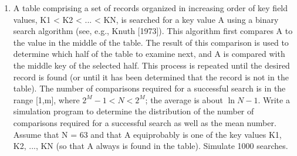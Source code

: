 \begin{enumerate}
  \item A table comprising a set of records organized in increasing order of
    key field values, K1 < K2 < ... < KN, is searched for a key value A using a
    binary search algorithm (see, e.g., Knuth [1973]). This algorithm first
    compares A to the value in the middle of the table. The result of this
    comparison is used to determine which half of the table to examine next,
    and A is compared with the middle key of the selected half. This process is
    repeated until the desired record is found (or until it has been determined
    that the record is not in the table). The number of comparisons required
    for a successful search is in the range [1,m], where \ensuremath{2^{M}-1 < N < 2^{M}}; the
    average is about \ensuremath{\ln N - 1}. Write a simulation program to determine the
    distribution of the number of comparisons required for a successful search
    as well as the mean number. Assume that N = 63 and that A equiprobably is
    one of the key values K1, K2, ..., KN (so that A always is found in the
    table). Simulate 1000 searches.
\end{enumerate}
